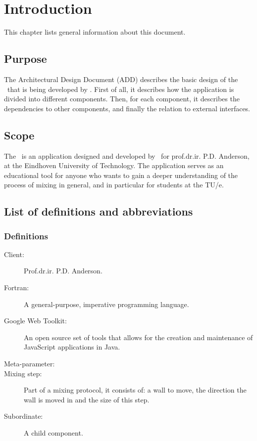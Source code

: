 \chapter{Introduction}

This chapter lists general information about this document.

\section{Purpose}
The Architectural Design Document (ADD) describes the basic design of the \applicationname\ that is being developed by \projectauthor. First of all, it describes how the application is divided into different components. Then, for each component, it describes the dependencies to other components, and finally the relation to external interfaces.

\section{Scope}
The \applicationname\ is an application designed and developed by \projectauthor\ for prof.dr.ir. P.D. Anderson, at the Eindhoven University of Technology. The application serves as an educational tool for anyone who wants to gain a deeper understanding of the process of mixing in general, and in particular for students at the TU/e.

\section{List of definitions and abbreviations}
\subsection{Definitions}
\begin{description}
\item[Client:] Prof.dr.ir. P.D. Anderson.
\item[Fortran:] A general-purpose, imperative programming language.
\item[Google Web Toolkit:] An open source set of tools that allows for the creation and maintenance of JavaScript applications in Java.
\item[Meta-parameter:] 
\item[Mixing step:] Part of a mixing protocol, it consists of: a wall to move, the direction the wall is moved in and the size of this step.
\item[Subordinate:] A child component.
\end{description}


